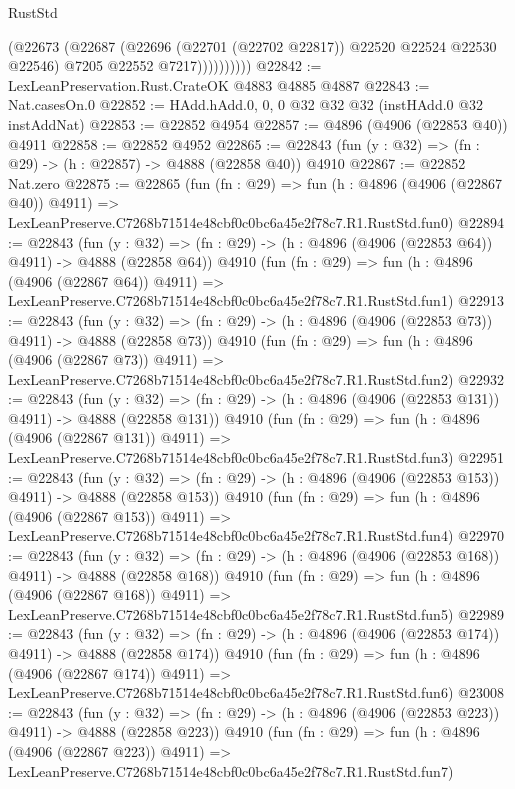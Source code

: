 \begin{lexlean}{RustStd}
\begin{coremodule}
                    (@22673
                      (@22687
                        (@22696 (@22701 (@22702 @22817)) @22520 @22524 @22530 @22546)
                        @7205
                        @22552
                        @7217))))))))))
@22842 := LexLeanPreservation.Rust.CrateOK @4883 @4885 @4887
@22843 := Nat.casesOn.{0}
@22852 := HAdd.hAdd.{0, 0, 0} @32 @32 @32 (instHAdd.{0} @32 instAddNat)
@22853 := @22852 @4954
@22857 := @4896 (@4906 (@22853 @40)) @4911
@22858 := @22852 @4952
@22865 := @22843 (fun (y : @32) => (fn : @29) -> (h : @22857) -> @4888 (@22858 @40)) @4910
@22867 := @22852 Nat.zero
@22875 := @22865
    (fun (fn : @29) =>
    fun (h : @4896 (@4906 (@22867 @40)) @4911) =>
    LexLeanPreserve.C7268b71514e48cbf0c0bc6a45e2f78c7.R1.RustStd.fun0)
@22894 := @22843
    (fun (y : @32) => (fn : @29) -> (h : @4896 (@4906 (@22853 @64)) @4911) -> @4888 (@22858 @64))
    @4910
    (fun (fn : @29) =>
    fun (h : @4896 (@4906 (@22867 @64)) @4911) =>
    LexLeanPreserve.C7268b71514e48cbf0c0bc6a45e2f78c7.R1.RustStd.fun1)
@22913 := @22843
    (fun (y : @32) => (fn : @29) -> (h : @4896 (@4906 (@22853 @73)) @4911) -> @4888 (@22858 @73))
    @4910
    (fun (fn : @29) =>
    fun (h : @4896 (@4906 (@22867 @73)) @4911) =>
    LexLeanPreserve.C7268b71514e48cbf0c0bc6a45e2f78c7.R1.RustStd.fun2)
@22932 := @22843
    (fun (y : @32) => (fn : @29) -> (h : @4896 (@4906 (@22853 @131)) @4911) -> @4888 (@22858 @131))
    @4910
    (fun (fn : @29) =>
    fun (h : @4896 (@4906 (@22867 @131)) @4911) =>
    LexLeanPreserve.C7268b71514e48cbf0c0bc6a45e2f78c7.R1.RustStd.fun3)
@22951 := @22843
    (fun (y : @32) => (fn : @29) -> (h : @4896 (@4906 (@22853 @153)) @4911) -> @4888 (@22858 @153))
    @4910
    (fun (fn : @29) =>
    fun (h : @4896 (@4906 (@22867 @153)) @4911) =>
    LexLeanPreserve.C7268b71514e48cbf0c0bc6a45e2f78c7.R1.RustStd.fun4)
@22970 := @22843
    (fun (y : @32) => (fn : @29) -> (h : @4896 (@4906 (@22853 @168)) @4911) -> @4888 (@22858 @168))
    @4910
    (fun (fn : @29) =>
    fun (h : @4896 (@4906 (@22867 @168)) @4911) =>
    LexLeanPreserve.C7268b71514e48cbf0c0bc6a45e2f78c7.R1.RustStd.fun5)
@22989 := @22843
    (fun (y : @32) => (fn : @29) -> (h : @4896 (@4906 (@22853 @174)) @4911) -> @4888 (@22858 @174))
    @4910
    (fun (fn : @29) =>
    fun (h : @4896 (@4906 (@22867 @174)) @4911) =>
    LexLeanPreserve.C7268b71514e48cbf0c0bc6a45e2f78c7.R1.RustStd.fun6)
@23008 := @22843
    (fun (y : @32) => (fn : @29) -> (h : @4896 (@4906 (@22853 @223)) @4911) -> @4888 (@22858 @223))
    @4910
    (fun (fn : @29) =>
    fun (h : @4896 (@4906 (@22867 @223)) @4911) =>
    LexLeanPreserve.C7268b71514e48cbf0c0bc6a45e2f78c7.R1.RustStd.fun7)

\end{coremodule}
\end{lexlean}
